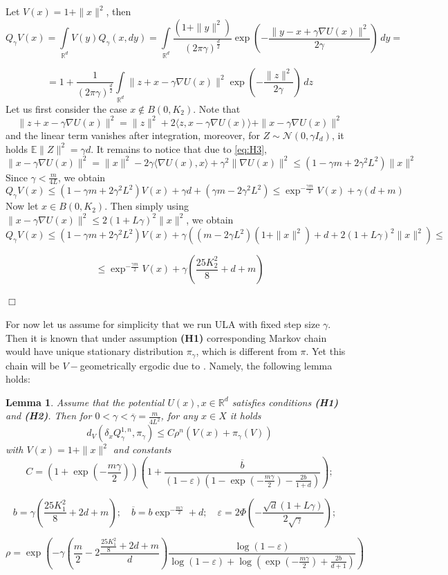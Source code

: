 \documentclass[bj]{imsart}
\def\rset{\mathbb{R}}
\def\rset{\mathbb{R}}
\newcommand{\proofendsign}{$\Box$}
\newtheorem{lem}[thm]{Lemma}
\newenvironment{proof}{{\noindent \bf Proof }}
 {{\hspace*{\fill}\proofendsign\par\bigskip}}
\begin{document}
\begin{proof} Let $V(x) = 1 + \|x\|^2$, then
$$
Q_{\gamma}V(x) = \int\limits_{\rset^d}V(y)Q_{\gamma}(x,dy) = \int\limits_{\rset^d}\frac{(1+\|y\|^2)}{(2\pi\gamma)^{\frac{d}{2}}}\exp{\left(-\frac{\|y-x+\gamma\nabla U(x)\|^2}{2\gamma}\right)}\,dy =
$$

$$
=1 + \frac{1}{(2\pi\gamma)^{\frac{d}{2}}}\int\limits_{\mathbb{R}^d}\|z + x - \gamma \nabla U(x)\|^2 \exp{\left(-\frac{\|z\|^2}{2\gamma}\right)}\,dz
$$
Let us first consider the case $x \notin B(0,K_2)$. Note that
$$
\|z+x-\gamma \nabla U(x)\|^2 = \|z\|^2 + 2 \langle z, x - \gamma \nabla U(x) \rangle + \|x - \gamma \nabla U(x)\|^2
$$
and the linear term vanishes after integration, moreover, for $Z \sim \mathcal{N}(0,\gamma I_d)$, it holds $\mathbb{E}\|Z\|^2 = \gamma d$. It remains to notice that due to \eqref{eq:H3},
\[
\|x - \gamma \nabla U(x) \|^2 = \|x\|^2 - 2\gamma \langle \nabla U(x), x\rangle + \gamma^2 \|\nabla U(x)\|^2 \leq \left(1 - \gamma m + 2\gamma^2 L^2\right)\|x\|^2
\]
Since $\gamma < \frac{m}{4L}$, we obtain
$$
Q_{\gamma}V(x) \leq (1-\gamma m + 2\gamma^2 L^2)V(x) + \gamma d + (\gamma m - 2\gamma^2 L^2) \leq \exp^{-\frac{\gamma m}{2}}V(x) + \gamma (d + m)
$$
Now let $x \in B(0,K_2)$. Then simply using $\|x-\gamma \nabla U(x)\|^2 \leq 2(1+L\gamma)^2\|x\|^2$, we obtain
$$
Q_{\gamma}V(x) \leq (1-\gamma m + 2\gamma^2 L^2)V(x) + \gamma\left((m - 2\gamma L^2)(1+\|x\|^2) + d + 2(1+L\gamma)^2\|x\|^2\right) \leq
$$

$$
\leq \exp^{-\frac{\gamma m}{2}}V(x) + \gamma(\frac{25K_2^2}{8} + d + m)
$$
\end{proof}

For now let us assume for simplicity that we run ULA with fixed step size $\gamma$. Then it is known that under assumption {\bf (H1)} corresponding Markov chain would have unique stationary distribution $\pi_\gamma$, which is different from $\pi$. Yet this chain will be $V-$geometrically ergodic due to \cite[Theorem~19.4.1]{moulines2018}. Namely, the following lemma holds:

\begin{lem}
\label{lem:v_ergodicity}
 Assume that the potential $U(x), x \in \mathbb{R}^d$ satisfies conditions {\bf (H1)} and {\bf (H2)}. Then for $0 < \gamma < \overline{\gamma}=\frac{m}{4L^2}$, for any $x \in X$ it holds
$$
d_V(\delta_xQ_{\gamma}^{1,n},\pi_\gamma) \leq C\rho^n\left(V(x) + \pi_\gamma(V)\right)
$$
with $V(x) = 1 + \|x\|^2$ and constants
$$
C = \left(1 + \exp{\left(-\frac{m\gamma}{2}\right)}\right)\left(1+\frac{\overline{b}}{(1-\varepsilon)(1-\exp{\left(-\frac{m\gamma}{2}\right)} - \frac{2b}{1+d})}\right);
$$

$$
b = \gamma(\frac{25K_1^2}{8} + 2d + m); \quad \overline{b} = b\exp^{-\frac{m\gamma}{2}} + d; \quad \varepsilon = 2\Phi\left(-\frac{\sqrt{d}(1+L\gamma)}{2\sqrt{\gamma}}\right); \quad
$$

$$
\rho = \exp{\left(-\gamma\left(\frac{m}{2} - 2\frac{\frac{25K_1^2}{8} + 2d + m}{d}\right)\frac{\log{(1-\varepsilon)}}{\log{(1-\varepsilon)} + \log{(\exp{\left(-\frac{m\gamma}{2}\right)} + \frac{2b}{d+1})}}\right)}
$$
\end{lem}
\end{document}
